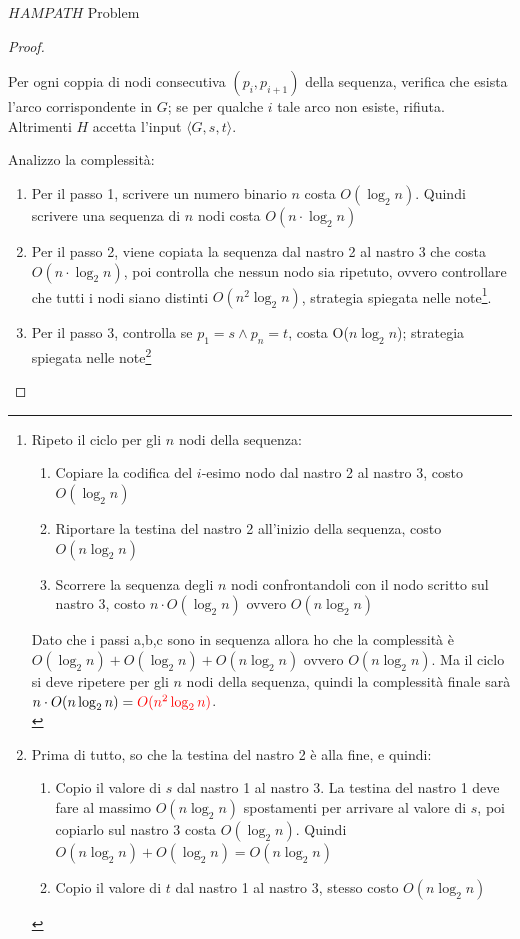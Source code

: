 \documentclass{article}  %
\theoremstyle{definition}
\begin{document}
\begin{theorem}{$HAMPATH$ Problem}
\begin{proof}
\begin{enumerate}
			      Per ogni coppia di nodi consecutiva $(p_i, p_{i+1})$ della sequenza, verifica che esista l'arco corrispondente in $G$; se
			      per qualche $i$ tale arco non esiste, rifiuta. Altrimenti $H$ accetta l'input $\langle G,s,t \rangle$.
		\end{enumerate}
		Analizzo la complessità:
		\begin{enumerate}
			\item Per il passo 1, scrivere un numero binario $n$ costa $O(\log_2n)$. Quindi scrivere una sequenza di $n$ nodi costa $O(n \cdot \log_2n)$
			\item Per il passo 2, viene copiata la sequenza dal nastro 2 al nastro 3 che costa $O(n \cdot \log_2n)$, poi controlla che nessun nodo
			      sia ripetuto, ovvero controllare che tutti i nodi siano distinti $O(n^2\log_2n)$, strategia spiegata nelle note\footnote{
				      Ripeto il ciclo per gli $n$ nodi della sequenza:
				      \begin{enumerate}
					      \item Copiare la codifica del $i$-esimo nodo dal nastro 2 al nastro 3, costo $O(\log_2n)$
					      \item Riportare la testina del nastro 2 all'inizio della sequenza, costo $O(n\log_2n)$
					      \item Scorrere la sequenza degli $n$ nodi confrontandoli con il nodo scritto sul nastro 3, costo $n\cdot O(\log_2n)$ ovvero $O(n \log_2n)$
				      \end{enumerate}
				      Dato che i passi a,b,c sono in sequenza allora ho che la complessità è $O(\log_2n)+O(\log_2n)+O(n\log_2n)$ ovvero $O(n\log_2n)$. Ma il ciclo
				      si deve ripetere per gli $n$ nodi della sequenza, quindi la complessità finale sarà $n\cdot O(n\log_2n)=\textcolor{red}{O(n^2\log_2n)}$. \\
			      }.
			\item Per il passo 3, controlla se $p_1=s \land p_n=t$, costa O($n\log_2n$); strategia spiegata nelle note\footnote{
				      Prima di tutto, so che la testina del nastro 2 è alla fine, e quindi:
				      \begin{enumerate}
					      \item Copio il valore di $s$ dal nastro 1 al nastro 3. La testina del nastro 1 deve fare al massimo $O(n\log_2n)$ spostamenti
					            per arrivare al valore di $s$, poi copiarlo sul nastro 3 costa $O(\log_2n)$. Quindi $O(n\log_2n)+O(\log_2n)=O(n\log_2n)$
					      \item Copio il valore di $t$ dal nastro 1 al nastro 3, stesso costo $O(n\log_2n)$

\end{enumerate}}
\end{enumerate}
\end{proof}
\end{theorem}
\end{document}
